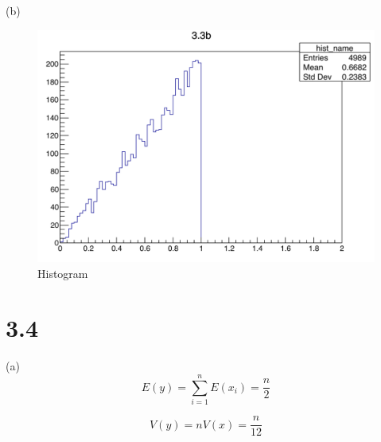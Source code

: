 \documentclass{article}
\begin{document}
\begin{CJK*}{GBK}{song}
(b)
\begin{figure}[H]
\centerline{\includegraphics[scale=0.4]{3.3b.png}}
\caption{Histogram}
\label{fig:label}
\end{figure}




\section{3.4}
(a)
\begin{equation}
E(y)=\sum_{i=1}^nE(x_i)=\frac{n}{2}
\end{equation}

\begin{equation}
V(y)=nV(x)=\frac{n}{12}
\end{equation}


\end{CJK*}
\end{document}
